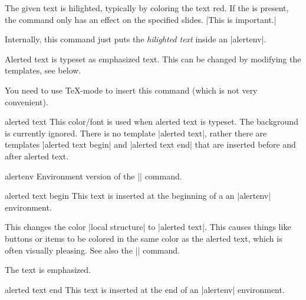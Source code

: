 \begin{command}{\alert{}}
  The given text is hilighted, typically by coloring the text red. If
  the  is present, the command only has an
  effect on the specified slides.
  \example |This is \alert{important}.|

  Internally, this command just puts the \emph{hilighted text} inside
  an |alertenv|.
  
  \articlenote
  Alerted text is typeset as emphasized text. This can be changed by
  modifying the templates, see below.

  \lyxnote
  You need to use \TeX-mode to insert this command (which is not very
  convenient).

  \begin{element}{alerted text}\no\yes\yes
    This color/font is used when alerted text is typeset. The
    background is currently ignored. There is no template
    |alerted text|, rather there are templates |alerted text begin|
    and |alerted text end| that are inserted before and after alerted
    text.
  \end{element}
\end{command}

\begin{environment}{{alertenv}}
  Environment version of the |\alert| command.

  \begin{element}{alerted text begin}\yes\no\no
    This text is inserted at the beginning of a an |alertenv|
    environment.

    \begin{templateoptions}

      \beamernote
      This changes the color |local structure| to |alerted text|. This
      causes things like buttons or items to be colored in the same
      color as the alerted text, which is often visually pleasing. See
      also the |\structure| command.

      \articlenote
      The text is emphasized.
    \end{templateoptions}
  \end{element}

  \begin{element}{alerted text end}\yes\no\no
    This text is inserted at the end of an |alertenv| environment.
  \end{element}
\end{environment}




